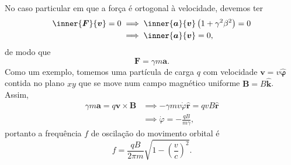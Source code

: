 No caso particular em que a força é ortogonal à velocidade, devemos ter
\begin{align*}
    \inner{\boldsymbol{F}}{\boldsymbol{v}} = 0 &\implies \inner{\boldsymbol{a}}{\boldsymbol{v}}\left(1 + \gamma^2 \beta^2\right) = 0\\
                                 &\implies \inner{\boldsymbol{a}}{\boldsymbol{v}} = 0,
\end{align*}
de modo que
\begin{equation*}
    \boldsymbol{F} = \gamma m\boldsymbol{a}.
\end{equation*}
Como um exemplo, tomemos uma partícula de carga \(q\) com velocidade \(\boldsymbol{v} = v \boldsymbol{\hat{\varphi}}\) contida no plano \(xy\) que se move num campo magnético uniforme \(\boldsymbol{B} = B \boldsymbol{\hat{k}}\). Assim,
\begin{align*}
    \gamma m\boldsymbol{a} = q \boldsymbol{v} \times \boldsymbol{B} &\implies -\gamma m v \dot\varphi \boldsymbol{\hat{r}} = qvB \boldsymbol{\hat{r}}\\
                                               &\implies \dot\varphi = -\frac{qB}{m \gamma},
\end{align*}
portanto a frequência \(f\) de oscilação do movimento orbital é
\begin{equation*}
    f = \frac{qB}{2\pi m}\sqrt{1 - \left(\frac{v}{c}\right)^2}.
\end{equation*}
